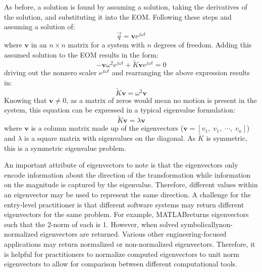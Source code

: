 \documentclass[12pt,letter]{article}
\begin{document}
	As before, a solution is found by assuming a solution, taking the derivatives of the solution, and substituting it into the EOM. Following these steps and assuming a solution of:
	\begin{equation}
	\vec{q} = \textbf{v}e^{j\omega t}
	\end{equation}
	where $\textbf{v}$ in an $n \times n$ matrix for a system with $n$ degrees of freedom. Adding this assumed solution to the EOM results in the form:
	\begin{equation}
	-\textbf{v} \omega^2 e^{j\omega t} + \widetilde{K}\textbf{v}e^{j\omega t} =0
	\end{equation}
	driving out the nonzero scaler $e^{j\omega t}$ and rearranging the above expression results in:
	\begin{equation}
	\widetilde{K}\textbf{v} =  \omega^2 \textbf{v}
	\end{equation}
	Knowing that $\textbf{v}\neq0$, as a matrix of zeros would mean no motion is present in the system, this equation can be expressed in a typical eigenvalue formulation:
	\begin{equation}
	\widetilde{K}\textbf{v} =  \lambda \textbf{v}
	\label{eq:eigenvalue_problem}
	\end{equation}
	where $\textbf{v}$ is a column matrix made up of the eigenvectors ($\textbf{v} = [v_1, \; v_1, \; \cdots, \; v_n ]$) and 
	$\lambda$ is a square matrix with eigenvalues on the diagonal. As $\widetilde{K}$ is symmetric, this is a symmetric eigenvalue problem. 
	
	An important attribute of eigenvectors to note is that the eigenvectors only encode information about the direction of the transformation while information on the magnitude is captured by the eigenvalue. Therefore, different values within an eigenvector may be used to represent the same direction.  A challenge for the entry-level practitioner is that different software systems may return different eigenvectors for the same problem. For example, MATLAB\protect\footnotemark[1] returns eigenvectors such that the 2-norm of each is 1. However, when solved symbolically\protect\footnotemark[2] non-normalized eigenvectors are returned. Various other engineering-focused applications may return normalized or non-normalized eigenvectors\protect\footnotemark[3]. Therefore, it is helpful for practitioners to normalize computed eigenvectors to unit norm eigenvectors to allow for comparison between different computational tools. 
	

	
\end{document}
